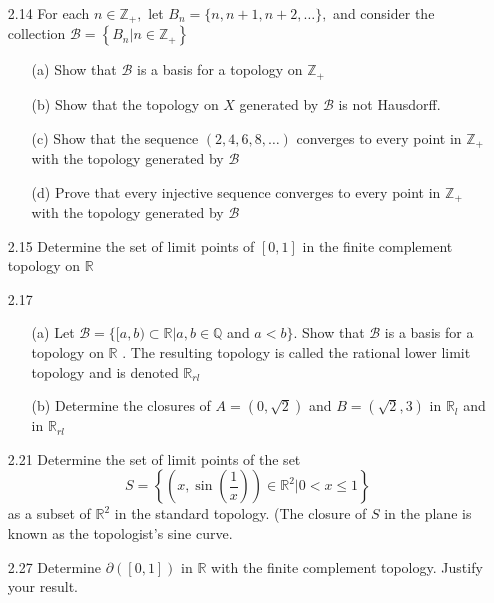 \documentclass[12pt]{article}
\newcommand{\R}{\mathds{R}}
\begin{document}
\pagestyle{fancy}  \chead{\textcolor{red}{03/01/2019}}
\rhead{\textcolor{red}{Austin Klum}} 
\lfoot{} \cfoot{} \rfoot{}

\begin{enumerate}
	\item[2.14] For each $n \in \mathbb { Z } _ { + } ,$ let $B _ { n } = \{ n , n + 1 , n + 2 , \ldots \} ,$ and consider the collection $\mathcal { B } = \left\{ B _ { n } | n \in \mathbb { Z } _ { + } \right\}$
	\begin{enumerate}
		\item[(a)] Show that $\mathcal { B }$ is a basis for a topology on $\mathbb { Z } _ { + }$
		\item[(b)] Show that the topology on $X$ generated by $\mathcal { B }$ is not Hausdorff.
		\item[(c)] Show that the sequence $( 2,4,6,8 , \dots )$ converges to every point in $\mathbb { Z } _ { + }$ with the topology generated by $\mathcal { B }$
		\item[(d)] Prove that every injective sequence converges to every point in $\mathbb { Z } _ { + }$ with the topology generated by $\mathcal { B }$
	\end{enumerate}
	\item[2.15] Determine the set of limit points of $[ 0,1 ]$ in the finite complement topology on $ \R $
	\item[2.17] 
		\begin{enumerate}
			\item[(a)] Let $\mathcal { B } = \{ [ a , b ) \subset \mathbb { R } | a , b \in \mathbb { Q }$ and $a < b \} .$ Show that $\mathcal { B }$ is a basis for a topology on $\mathbb { R }$ . The resulting topology is called the rational lower limit topology and is denoted $\mathbb { R } _ { r l }$
			\item[(b)] Determine the closures of $A = ( 0 , \sqrt { 2 } )$ and $B = ( \sqrt { 2 } , 3 )$ in $\mathbb { R } _ { l }$ and in $\mathbb { R } _ { r l }$
		\end{enumerate}
	\item[2.21] Determine the set of limit points of the set
		\[S = \left\{ \left( x , \sin \left( \frac { 1 } { x } \right) \right) \in \mathbb { R } ^ { 2 } | 0 < x \leq 1 \right\}\]
		as a subset of $\mathbb { R } ^ { 2 }$ in the standard topology. (The closure of $S$ in the plane is known as the topologist's sine curve.
	\item[2.27] Determine $\partial ( [ 0,1 ] )$ in $\mathbb { R }$ with the finite complement topology. Justify your result.

\end{enumerate}
\end{document}
